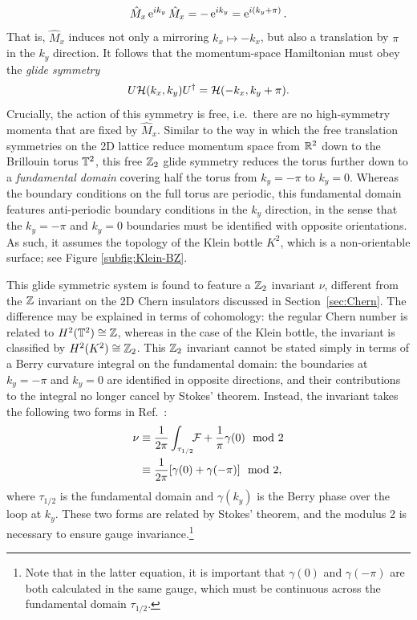 \begin{equation*}
	\hat{M}_x\operatorname{e}^{ik_y}\hat{M}_x = -\operatorname{e}^{ik_y} = \operatorname{e}^{i(k_y+\pi)}.
\end{equation*}
That is, $\hat{M}_x$ induces not only a mirroring $k_x\mapsto-k_x$, but also a translation by $\pi$ in the $k_y$ direction. It follows that the momentum-space Hamiltonian must obey the \emph{glide symmetry}
\begin{equation}\label{eq:2D_glide}
	U\mathcal{H}(k_x, k_y)U^\dag = \mathcal{H}(-k_x, k_y + \pi).
\end{equation}
Crucially, the action of this symmetry is free, i.e.\ there are no high-symmetry momenta that are fixed by $\hat{M}_x$. Similar to the way in which the free translation symmetries on the 2D lattice reduce momentum space from $\mathbb{R}^2$ down to the Brillouin torus $\mathbb{T}^2$, this free $\mathbb{Z}_2$ glide symmetry reduces the torus further down to a \emph{fundamental domain} covering half the torus from $k_y=-\pi$ to $k_y=0$. Whereas the boundary conditions on the full torus are periodic, this fundamental domain features anti-periodic boundary conditions in the $k_y$ direction, in the sense that the $k_y=-\pi$ and $k_y=0$ boundaries must be identified with opposite orientations. As such, it assumes the topology of the Klein bottle $K^2$, which is a non-orientable surface; see Figure \ref{subfig:Klein-BZ}.

This glide symmetric system is found to feature a $\mathbb{Z}_2$ invariant $\nu$, different from the $\mathbb{Z}$ invariant on the 2D Chern insulators discussed in Section~\ref{sec:Chern}. The difference may be explained in terms of cohomology: the regular Chern number is related to $H^2(\mathbb{T}^2)\cong\mathbb{Z}$, whereas in the case of the Klein bottle, the invariant is classified by $H^2(K^2)\cong\mathbb{Z}_2$. This $\mathbb{Z}_2$ invariant cannot be stated simply in terms of a Berry curvature integral on the fundamental domain: the boundaries at $k_y=-\pi$ and $k_y=0$ are identified in opposite directions, and their contributions to the integral no longer cancel by Stokes' theorem. Instead, the invariant takes the following two forms in Ref.~\cite{CYZ_Klein-gauge}:
\begin{align}
	\nu &\equiv \frac{1}{2\pi}\int_{\tau_{1/2}}\!\!\mathcal{F} + \frac{1}{\pi}\gamma(0) \mod 2 \label{eq:z2-inv1} \\
		&\equiv \frac{1}{2\pi}[\gamma(0) + \gamma(-\pi)]\mod 2, \label{eq:z2-inv2}
\end{align}
where $\tau_{1/2}$ is the fundamental domain and $\gamma(k_y)$ is the Berry phase over the loop at $k_y$. These two forms are related by Stokes' theorem, and the modulus 2 is necessary to ensure gauge invariance.\footnote{
	Note that in the latter equation, it is important that $\gamma(0)$ and $\gamma(-\pi)$ are both calculated in the same gauge, which must be continuous across the fundamental domain $\tau_{1/2}$.}

